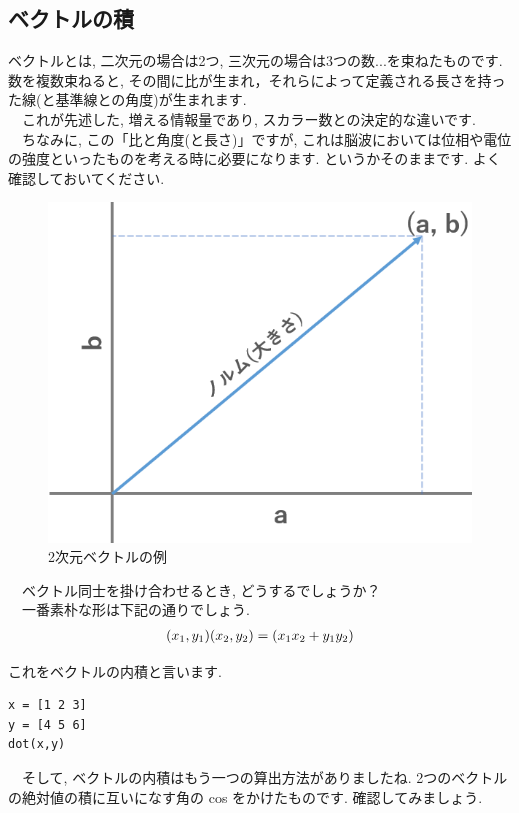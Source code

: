 \documentclass[11pt,a4paper]{jreport}
\begin{document}
\subsection{ベクトルの積}
ベクトルとは, 二次元の場合は2つ, 三次元の場合は3つの数...を束ねたものです. \\
数を複数束ねると, その間に比が生まれ，それらによって定義される長さを持った線(と基準線との角度)が生まれます. \\
　これが先述した, 増える情報量であり, スカラー数との決定的な違いです.\\
　ちなみに, この「比と角度(と長さ)」ですが, これは脳波においては位相や電位の強度といったものを考える時に必要になります. というかそのままです. よく確認しておいてください. 
\\

\begin{figure}[H]
\label{im:vector}
  \centering
  \includegraphics[width=120mm,bb=0 0 582 467]{../figures/vector.png}
  \caption{2次元ベクトルの例}
\end{figure}


　ベクトル同士を掛け合わせるとき, どうするでしょうか？\\
　一番素朴な形は下記の通りでしょう.\\
\begin{eqnarray}
\label{eq:veckake}
(\mathstrut x_1 , \mathstrut y_1)(\mathstrut x_2 , \mathstrut y_2 ) = (\mathstrut x_1 \mathstrut x_2 + \mathstrut y_1 \mathstrut y_2)
\end{eqnarray}

これをベクトルの内積と言います.\\
\begin{lstlisting}[caption=\ref{eq:veckake}のMATLABコード,label=sc:veckake]
x = [1 2 3]
y = [4 5 6]
dot(x,y)
\end{lstlisting}
　そして, ベクトルの内積はもう一つの算出方法がありましたね. 2つのベクトルの絶対値の積に互いになす角の cos をかけたものです. 確認してみましょう.\\
\end{document}
